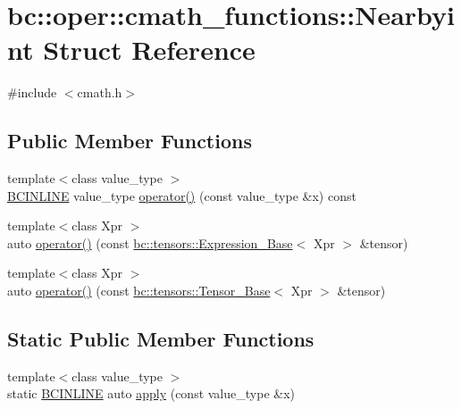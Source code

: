 \hypertarget{structbc_1_1oper_1_1cmath__functions_1_1Nearbyint}{}\section{bc\+:\+:oper\+:\+:cmath\+\_\+functions\+:\+:Nearbyint Struct Reference}
\label{structbc_1_1oper_1_1cmath__functions_1_1Nearbyint}


{\ttfamily \#include $<$cmath.\+h$>$}

\subsection*{Public Member Functions}
\begin{DoxyCompactItemize}
\item 
{\footnotesize template$<$class value\+\_\+type $>$ }\\\hyperlink{common_8h_a6699e8b0449da5c0fafb878e59c1d4b1}{B\+C\+I\+N\+L\+I\+NE} value\+\_\+type \hyperlink{structbc_1_1oper_1_1cmath__functions_1_1Nearbyint_a4cbeb44a095f0edd07c7abff194ae80f}{operator()} (const value\+\_\+type \&x) const
\item 
{\footnotesize template$<$class Xpr $>$ }\\auto \hyperlink{structbc_1_1oper_1_1cmath__functions_1_1Nearbyint_adf240812ef549116a99c9f3811ec42f3}{operator()} (const \hyperlink{classbc_1_1tensors_1_1Expression__Base}{bc\+::tensors\+::\+Expression\+\_\+\+Base}$<$ Xpr $>$ \&tensor)
\item 
{\footnotesize template$<$class Xpr $>$ }\\auto \hyperlink{structbc_1_1oper_1_1cmath__functions_1_1Nearbyint_a6d94124df0092abf8ada2f0ba11fe3f9}{operator()} (const \hyperlink{classbc_1_1tensors_1_1Tensor__Base}{bc\+::tensors\+::\+Tensor\+\_\+\+Base}$<$ Xpr $>$ \&tensor)
\end{DoxyCompactItemize}
\subsection*{Static Public Member Functions}
\begin{DoxyCompactItemize}
\item 
{\footnotesize template$<$class value\+\_\+type $>$ }\\static \hyperlink{common_8h_a6699e8b0449da5c0fafb878e59c1d4b1}{B\+C\+I\+N\+L\+I\+NE} auto \hyperlink{structbc_1_1oper_1_1cmath__functions_1_1Nearbyint_a6e527c3938ede4699879dfabbc04e52a}{apply} (const value\+\_\+type \&x)
\end{DoxyCompactItemize}



